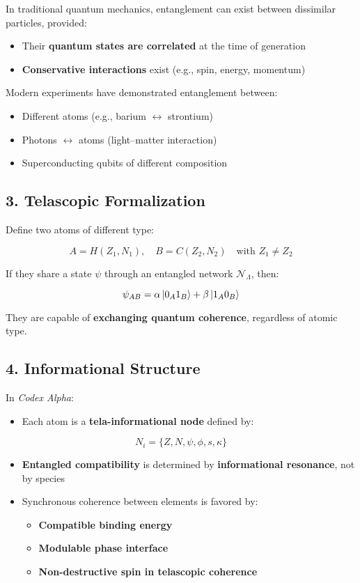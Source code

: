 \documentclass[12pt]{article}
\begin{document}
In traditional quantum mechanics, entanglement can exist between dissimilar particles, provided:

\begin{itemize}
    \item Their \textbf{quantum states are correlated} at the time of generation
    \item \textbf{Conservative interactions} exist (e.g., spin, energy, momentum)
\end{itemize}

Modern experiments have demonstrated entanglement between:

\begin{itemize}
    \item Different atoms (e.g., barium $\leftrightarrow$ strontium)
    \item Photons $\leftrightarrow$ atoms (light–matter interaction)
    \item Superconducting qubits of different composition
\end{itemize}

\subsection*{3. Telascopic Formalization}

Define two atoms of different type:

\[
A = H(Z_1, N_1), \quad B = C(Z_2, N_2) \quad \text{with } Z_1 \neq Z_2
\]

If they share a state $\psi$ through an entangled network $\mathcal{N}_\Lambda$, then:

\[
\psi_{AB} = \alpha \ket{0_A 1_B} + \beta \ket{1_A 0_B}
\]

They are capable of \textbf{exchanging quantum coherence}, regardless of atomic type.

\subsection*{4. Informational Structure}

In \textit{Codex Alpha}:

\begin{itemize}
    \item Each atom is a \textbf{tela-informational node} defined by:
\end{itemize}

\[
N_i = \{Z, N, \psi, \phi, s, \kappa\}
\]

\begin{itemize}
    \item \textbf{Entangled compatibility} is determined by \textbf{informational resonance}, not by species
    \item Synchronous coherence between elements is favored by:
    \begin{itemize}
        \item \textbf{Compatible binding energy}
        \item \textbf{Modulable phase interface}
        \item \textbf{Non-destructive spin in telascopic coherence}
    \end{itemize}
\end{itemize}
\end{document}
